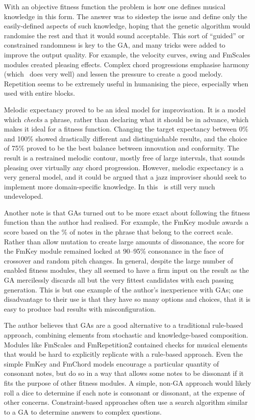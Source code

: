 With an objective fitness function the problem is how one defines musical knowledge in this form.
The answer was to sidestep the issue and define only the easily-defined aspects of such knowledge,
hoping that the genetic algorithm would randomise the rest and that it would sound acceptable.
This sort of ``guided'' or constrained randomness is key to the GA, and many tricks were added to
improve the output quality. For example, the velocity curves, swing and
FmScales modules created pleasing effects. Complex chord progressions emphasise harmony (which \jg\
does very well) and lessen the pressure to create a good melody. Repetition seems to be
extremely useful in humanising the piece, especially when used with entire blocks.

Melodic expectancy proved to be an ideal model for improvisation. It is a model which \emph{checks}
a phrase, rather than declaring what it should be in advance, which makes it ideal for a fitness
function. Changing the target expectancy between 0\% and 100\% showed drastically different and 
distinguishable results, and the choice of 75\% proved to be the best balance between innovation
and conformity. The result is a restrained melodic contour, mostly free of large intervals, that
sounds pleasing over virtually any chord progression. However, melodic expectancy is a very
general model, and it could be argued that a jazz improviser should seek to implement more domain-specific
knowledge. In this \jg\ is still very much undeveloped.

Another note is that GAs turned out to be more exact about following the fitness function than the author
had realised. For example, the FmKey module awards a score based on the \% of notes in the phrase that
belong to the correct scale. Rather than allow mutation to create large amounts of dissonance, the score
for the FmKey module remained locked at 90--95\% consonance in the face of crossover and random pitch
changes. In general, despite the large number of enabled fitness modules, they all seemed to have a firm
input on the result as the GA mercilessly discards all but the very fittest candidates with each passing
generation. This is but one example of the author's inexperience with GAs; one disadvantage to their use
is that they have so many options and choices, that it is easy to produce bad results with misconfiguration.

The author believes that GAs are a good alternative to a traditional rule-based approach, combining elements
from stochastic and knowledge-based composition. Modules like FmScales and FmRepetition2 contained checks
for musical elements that would be hard to explicitly replicate with a rule-based approach. Even the 
simple FmKey and FmChord models encourage a particular quantity of consonant notes, but do so in a way
that allows some notes to be dissonant if it fits the purpose of other fitness modules. A simple, non-GA
approach would likely roll a dice to determine if each note is consonant or dissonant, at the expense
of other concerns. Constraint-based approaches often use a search algorithm similar to a GA to determine
answers to complex questions.

